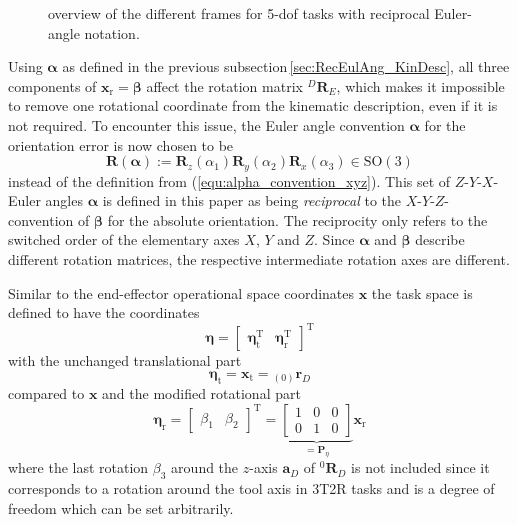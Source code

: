 \documentclass[twocolumn,10pt]{IFTOMM}
\newcommand{\bm}[1]{\boldsymbol{#1}}
\newcommand{\ortvek}[4]{{ }_{(#1)}{\boldsymbol{#2}}^{#3}_{#4} }
\newcommand{\rotmat}[2]{{{ }^{#1}\boldsymbol{R}}_{#2}}
\newcommand{\transp}[0]{{\mathrm{T}}}
\begin{document}
\begin{figure}[htb]
    
    \caption{overview of the different frames for 5-dof tasks with reciprocal Euler-angle notation.}
    \label{fig:frames_5dof}
\end{figure} 

Using $\bm{\alpha}$ as defined in the previous subsection\,\ref{sec:RecEulAng_KinDesc}, all three components of $\bm{x}_{\mathrm{r}}=\bm{\beta}$ affect the rotation matrix $\rotmat{D}{E}$, which makes it impossible to remove one rotational coordinate from the kinematic description, even if it is not required.
%
To encounter this issue, the Euler angle convention $\bm{\alpha}$ for the orientation error is now chosen to be 
%
\begin{equation}
\bm{R}(\bm{\alpha}) := \bm{R}_z(\alpha_1) \bm{R}_y(\alpha_2) \bm{R}_x(\alpha_3) \in \mathrm{SO(3)}
\label{equ:def_rmat_zyxr}
\end{equation}
%
instead of the definition from (\ref{equ:alpha_convention_xyz}).
This set of $Z$-$Y$-$X$-Euler angles $\bm{\alpha}$ is defined in this paper as being \emph{reciprocal} to the $X$-$Y$-$Z$-convention of $\bm{\beta}$ for the absolute orientation.
%
The reciprocity only refers to the switched order of the elementary axes $X$, $Y$ and $Z$.
Since $\bm{\alpha}$ and $\bm{\beta}$ describe different rotation matrices, the respective intermediate rotation axes are different.

Similar to the end-effector operational space coordinates $\bm{x}$ the task space is defined to have the coordinates
%
\begin{equation}
\bm{\eta}
=
\begin{bmatrix}
\bm{\eta}_{\mathrm{t}}^\transp & 
\bm{\eta}_{\mathrm{r}}^\transp
\end{bmatrix}^\transp
\end{equation}  
%
with the unchanged translational part
%
\begin{equation}
\bm{\eta}_{\mathrm{t}}
=
\bm{x}_{\mathrm{t}}
=
\ortvek{0}{r}{}{D}
\end{equation}  
%
compared to $\bm{x}$ and the modified rotational part
%
\begin{equation}
\bm{\eta}_{\mathrm{r}}
=
\begin{bmatrix}
\beta_1  & \beta_2
\end{bmatrix}^\transp
=
\underbrace{\begin{bmatrix}
1 & 0 & 0  \\ 
0 & 1 & 0
\end{bmatrix}}_{=\bm{P}_{\eta}}
\bm{x}_{\mathrm{r}}
\label{equ:etar_def}
\end{equation}
%
where the last rotation $\beta_3$ around the $z$-axis $\bm{a}_{D}$ of $\rotmat{0}{D}$ is not included since it corresponds to a rotation around the tool axis in 3T2R tasks and is a degree of freedom which can be set arbitrarily.
\end{document}
